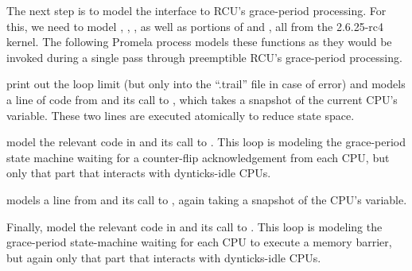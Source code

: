 The next step is to model the interface to RCU's grace-period
processing.
For this, we need to model
,
,
,
as well as portions of
 and
, all from the 2.6.25-rc4 kernel.
The following  Promela process models
these functions as they would be invoked during a single pass
through preemptible RCU's grace-period processing.



\begin{fcvref}
 print out the loop limit
(but only into the ``.trail'' file
in case of error) and models a line of code
from  and its call to
, which takes a
snapshot of the current CPU's 
variable.
These two lines are executed atomically to reduce state space.

 model the relevant code in
 and its call to
.
This loop is modeling the grace-period state machine waiting for
a counter-flip acknowledgement from each CPU, but only that part
that interacts with dynticks-idle CPUs.

 models a line from 
and its call to , again
taking a snapshot of the CPU's 
variable.

Finally,  model the relevant code in
 and its call to
.
This loop is modeling the grace-period state-machine waiting for
each CPU to execute a memory barrier, but again only that part
that interacts with dynticks-idle CPUs.
\end{fcvref}

\QuickQuizEnd

